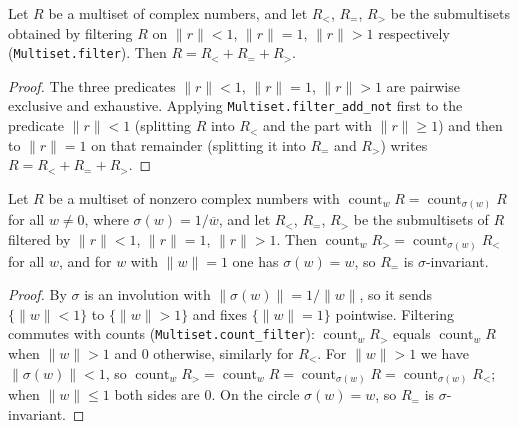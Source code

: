 \begin{lemma}
    \label{lem:fr-build-S-partition}
    \leanok
    Let $R$ be a multiset of complex numbers, and let $R_{<}$, $R_{=}$, $R_{>}$
    be the submultisets obtained by filtering $R$ on $\|r\| < 1$, $\|r\| = 1$,
    $\|r\| > 1$ respectively (\texttt{Multiset.filter}). Then
    $R = R_{<} + R_{=} + R_{>}$.
\end{lemma}
\begin{proof}
    The three predicates $\|r\| < 1$, $\|r\| = 1$, $\|r\| > 1$ are pairwise
    exclusive and exhaustive. Applying \texttt{Multiset.filter\_add\_not} first
    to the predicate $\|r\| < 1$ (splitting $R$ into $R_{<}$ and the part with
    $\|r\| \ge 1$) and then to $\|r\| = 1$ on that remainder (splitting it into
    $R_{=}$ and $R_{>}$) writes $R = R_{<} + R_{=} + R_{>}$.
\end{proof}

\begin{lemma}
    \label{lem:fr-build-S-count-transport}
    \leanok
    Let $R$ be a multiset of nonzero complex numbers with
    $\operatorname{count}_w R = \operatorname{count}_{\sigma(w)} R$ for all
    $w \neq 0$, where $\sigma(w) = 1/\overline{w}$, and let $R_{<}$, $R_{=}$,
    $R_{>}$ be the submultisets of $R$ filtered by $\|r\| < 1$, $\|r\| = 1$,
    $\|r\| > 1$. Then $\operatorname{count}_w R_{>}
    = \operatorname{count}_{\sigma(w)} R_{<}$ for all $w$, and for $w$ with
    $\|w\| = 1$ one has $\sigma(w) = w$, so $R_{=}$ is $\sigma$-invariant.
\end{lemma}
\begin{proof}
    By  $\sigma$ is an involution with
    $\|\sigma(w)\| = 1/\|w\|$, so it sends $\{\|w\| < 1\}$ to $\{\|w\| > 1\}$ and
    fixes $\{\|w\| = 1\}$ pointwise. Filtering commutes with counts
    (\texttt{Multiset.count\_filter}): $\operatorname{count}_w R_{>}$ equals
    $\operatorname{count}_w R$ when $\|w\| > 1$ and $0$ otherwise, similarly for
    $R_{<}$. For $\|w\| > 1$ we have $\|\sigma(w)\| < 1$, so
    $\operatorname{count}_w R_{>} = \operatorname{count}_w R
    = \operatorname{count}_{\sigma(w)} R = \operatorname{count}_{\sigma(w)} R_{<}$;
    when $\|w\| \le 1$ both sides are $0$. On the circle $\sigma(w) = w$, so
    $R_{=}$ is $\sigma$-invariant.
\end{proof}

